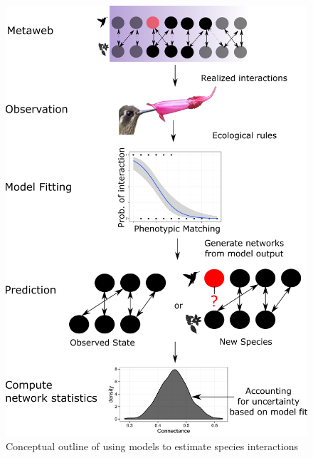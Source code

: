 \begin{figure}
  \includegraphics[width=\linewidth]{Figures/ConceptualFigure.png}
  \caption{Conceptual outline of using models to estimate species
  interactions}
  \label{fig:concept}
\end{figure}
